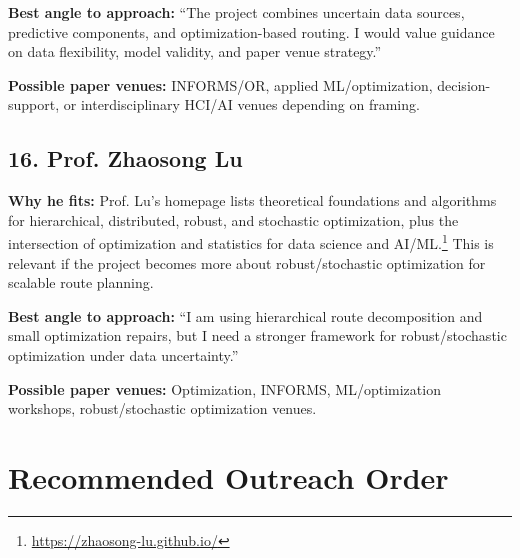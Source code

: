 \documentclass[11pt,a4paper]{article}
\begin{document}
\noindent \textbf{Best angle to approach:} ``The project combines uncertain data sources, predictive components, and optimization-based routing. I would value guidance on data flexibility, model validity, and paper venue strategy.''

\noindent \textbf{Possible paper venues:} INFORMS/OR, applied ML/optimization, decision-support, or interdisciplinary HCI/AI venues depending on framing.

\subsection*{16. Prof. Zhaosong Lu}

\noindent \textbf{Why he fits:} Prof. Lu's homepage lists theoretical foundations and algorithms for hierarchical, distributed, robust, and stochastic optimization, plus the intersection of optimization and statistics for data science and AI/ML.\footnote{\url{https://zhaosong-lu.github.io/}} This is relevant if the project becomes more about robust/stochastic optimization for scalable route planning.

\noindent \textbf{Best angle to approach:} ``I am using hierarchical route decomposition and small optimization repairs, but I need a stronger framework for robust/stochastic optimization under data uncertainty.''

\noindent \textbf{Possible paper venues:} Optimization, INFORMS, ML/optimization workshops, robust/stochastic optimization venues.

\section*{Recommended Outreach Order}
\end{document}
